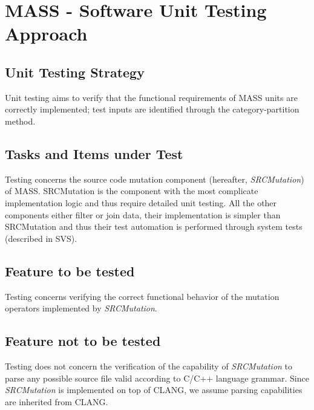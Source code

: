 
\chapter{MASS - Software Unit Testing Approach}


\section{Unit Testing Strategy}


Unit testing aims to verify that the functional requirements of MASS units are correctly implemented; test inputs are identified through the category-partition method.


\section{Tasks and Items under Test}

Testing concerns the source code mutation component (hereafter, \emph{SRCMutation}) of MASS.
SRCMutation is the component with the most complicate implementation logic and thus require detailed unit testing.
All the other components either filter or join data, their implementation is simpler than SRCMutation and thus their test automation is performed through system tests (described in SVS).

\section{Feature to be tested}

Testing concerns verifying the correct functional behavior of the mutation operators implemented by \emph{SRCMutation}.

\section{Feature not to be tested}

Testing does not concern the verification of the capability of \emph{SRCMutation} to parse any possible source file valid according to C/C++ language grammar. Since \emph{SRCMutation} is implemented on top of CLANG, we assume parsing capabilities are inherited from CLANG.



